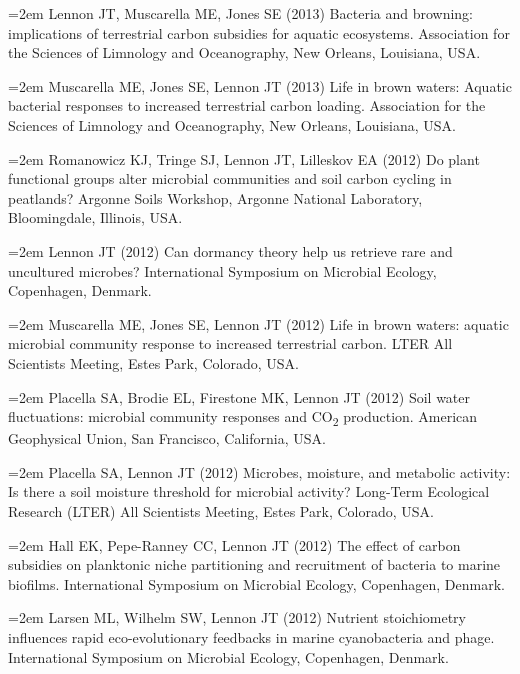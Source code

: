 \documentclass[11pt]{article}
\begin{document}
{\hangindent=2em Lennon JT, Muscarella ME, Jones SE (2013) Bacteria and browning: implications of terrestrial carbon subsidies for aquatic ecosystems. Association for the Sciences of Limnology and Oceanography, New Orleans, Louisiana, USA. \par

\hangindent=2em Muscarella ME, Jones SE, Lennon JT (2013) Life in brown waters: Aquatic bacterial responses to increased terrestrial carbon loading. Association for the Sciences of Limnology and Oceanography, New Orleans, Louisiana, USA. \par

\hangindent=2em Romanowicz KJ, Tringe SJ, Lennon JT, Lilleskov EA (2012) Do plant functional groups alter microbial communities and soil carbon cycling in peatlands? Argonne Soils Workshop, Argonne National Laboratory, Bloomingdale, Illinois, USA. \par

\hangindent=2em Lennon JT (2012) Can dormancy theory help us retrieve rare and uncultured microbes? International Symposium on Microbial Ecology, Copenhagen, Denmark. \par

\hangindent=2em Muscarella ME, Jones SE, Lennon JT (2012) Life in brown waters: aquatic microbial community response to increased terrestrial carbon. LTER All Scientists Meeting, Estes Park, Colorado, USA. \par

\hangindent=2em Placella SA, Brodie EL, Firestone MK, Lennon JT (2012) Soil water fluctuations: microbial community responses and CO\textsubscript{2} production. American Geophysical Union, San Francisco, California, USA. \par

\hangindent=2em Placella SA, Lennon JT (2012) Microbes, moisture, and metabolic activity: Is there a soil moisture threshold for microbial activity? Long-Term Ecological Research (LTER) All Scientists Meeting, Estes Park, Colorado, USA. \par

\hangindent=2em Hall EK, Pepe-Ranney CC, Lennon JT (2012) The effect of carbon subsidies on planktonic niche partitioning and recruitment of bacteria to marine biofilms. International Symposium on Microbial Ecology, Copenhagen, Denmark. \par

\hangindent=2em Larsen ML, Wilhelm SW, Lennon JT (2012) Nutrient stoichiometry influences rapid eco-evolutionary feedbacks in marine cyanobacteria and phage. International Symposium on Microbial Ecology, Copenhagen, Denmark. \par

}
\end{document}
